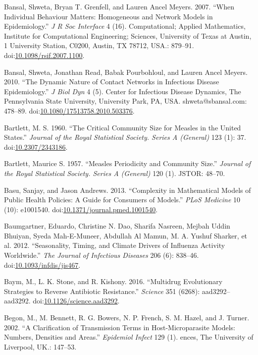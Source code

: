 \documentclass[]{book}
\theoremstyle{definition}
\theoremstyle{definition}
\theoremstyle{definition}
\theoremstyle{remark}
\begin{document}
\hypertarget{ref-bansal07}{}
Bansal, Shweta, Bryan T. Grenfell, and Lauren Ancel Meyers. 2007. ``When
Individual Behaviour Matters: Homogeneous and Network Models in
Epidemiology.'' \emph{J R Soc Interface} 4 (16). Computational; Applied
Mathematics, Institute for Computational Engineering; Sciences,
University of Texas at Austin, 1 University Station, C0200, Austin, TX
78712, USA.: 879--91.
doi:\href{https://doi.org/10.1098/rsif.2007.1100}{10.1098/rsif.2007.1100}.

\hypertarget{ref-bansal10}{}
Bansal, Shweta, Jonathan Read, Babak Pourbohloul, and Lauren Ancel
Meyers. 2010. ``The Dynamic Nature of Contact Networks in Infectious
Disease Epidemiology.'' \emph{J Biol Dyn} 4 (5). Center for Infectious
Disease Dynamics, The Pennsylvania State University, University Park,
PA, USA. shweta@sbansal.com: 478--89.
doi:\href{https://doi.org/10.1080/17513758.2010.503376}{10.1080/17513758.2010.503376}.

\hypertarget{ref-bartlett60}{}
Bartlett, M. S. 1960. ``The Critical Community Size for Measles in the
United States.'' \emph{Journal of the Royal Statistical Society. Series
A (General)} 123 (1): 37.
doi:\href{https://doi.org/10.2307/2343186}{10.2307/2343186}.

\hypertarget{ref-bartlett57}{}
Bartlett, Maurice S. 1957. ``Measles Periodicity and Community Size.''
\emph{Journal of the Royal Statistical Society. Series A (General)} 120
(1). JSTOR: 48--70.

\hypertarget{ref-basu13}{}
Basu, Sanjay, and Jason Andrews. 2013. ``Complexity in Mathematical
Models of Public Health Policies: A Guide for Consumers of Models.''
\emph{PLoS Medicine} 10 (10): e1001540.
doi:\href{https://doi.org/10.1371/journal.pmed.1001540}{10.1371/journal.pmed.1001540}.

\hypertarget{ref-baumgartner12}{}
Baumgartner, Eduardo, Christine N. Dao, Sharifa Nasreen, Mejbah Uddin
Bhuiyan, Syeda Mah-E-Muneer, Abdullah Al Mamun, M. A. Yushuf Sharker, et
al. 2012. ``Seasonality, Timing, and Climate Drivers of Influenza
Activity Worldwide.'' \emph{The Journal of Infectious Diseases} 206 (6):
838--46.
doi:\href{https://doi.org/10.1093/infdis/jis467}{10.1093/infdis/jis467}.

\hypertarget{ref-baym16}{}
Baym, M., L. K. Stone, and R. Kishony. 2016. ``Multidrug Evolutionary
Strategies to Reverse Antibiotic Resistance.'' \emph{Science} 351
(6268): aad3292--aad3292.
doi:\href{https://doi.org/10.1126/science.aad3292}{10.1126/science.aad3292}.

\hypertarget{ref-begon02}{}
Begon, M., M. Bennett, R. G. Bowers, N. P. French, S. M. Hazel, and J.
Turner. 2002. ``A Clarification of Transmission Terms in
Host-Microparasite Models: Numbers, Densities and Areas.''
\emph{Epidemiol Infect} 129 (1). ences, The University of Liverpool,
UK.: 147--53.
\end{document}
